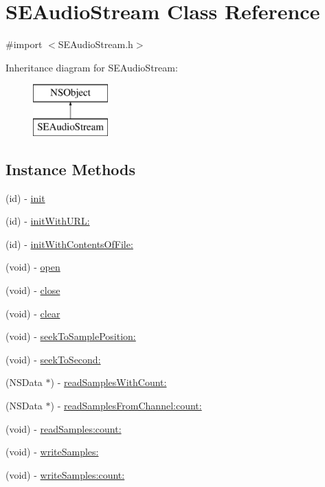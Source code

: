 \hypertarget{interface_s_e_audio_stream}{\section{S\-E\-Audio\-Stream Class Reference}
\label{interface_s_e_audio_stream}
}


{\ttfamily \#import $<$S\-E\-Audio\-Stream.\-h$>$}

Inheritance diagram for S\-E\-Audio\-Stream\-:\begin{figure}[H]
\begin{center}
\leavevmode
\includegraphics[height=2.000000cm]{interface_s_e_audio_stream}
\end{center}
\end{figure}
\subsection*{Instance Methods}
\begin{DoxyCompactItemize}
\item 
(id) -\/ \hyperlink{interface_s_e_audio_stream_adfb80527c355e64279d60a7b1af838ea}{init}
\item 
(id) -\/ \hyperlink{interface_s_e_audio_stream_a7acd0370d5f5066a6d00834af0eea200}{init\-With\-U\-R\-L\-:}
\item 
(id) -\/ \hyperlink{interface_s_e_audio_stream_a88b28dfe93892a08d261bd946beea26f}{init\-With\-Contents\-Of\-File\-:}
\item 
(void) -\/ \hyperlink{interface_s_e_audio_stream_add81dd9d9bd838f3a5dc1ceae94ccf26}{open}
\item 
(void) -\/ \hyperlink{interface_s_e_audio_stream_a8c4af367964e8be4817df12989f06d40}{close}
\item 
(void) -\/ \hyperlink{interface_s_e_audio_stream_ae59699f3f9cdf5fa000d9835da89e73e}{clear}
\item 
(void) -\/ \hyperlink{interface_s_e_audio_stream_a1dd26e76fbcd65f2d221f61de75fd3eb}{seek\-To\-Sample\-Position\-:}
\item 
(void) -\/ \hyperlink{interface_s_e_audio_stream_a720083efde7839f0a44ec7456805ffeb}{seek\-To\-Second\-:}
\item 
(N\-S\-Data $\ast$) -\/ \hyperlink{interface_s_e_audio_stream_a8d848d7a388d38fb670eb92e3bf6566d}{read\-Samples\-With\-Count\-:}
\item 
(N\-S\-Data $\ast$) -\/ \hyperlink{interface_s_e_audio_stream_a4501c22126f23cc1cb9ecbd1d7ddda6e}{read\-Samples\-From\-Channel\-:count\-:}
\item 
(void) -\/ \hyperlink{interface_s_e_audio_stream_ac80704c916ddbac8f8309f3a6a019e80}{read\-Samples\-:count\-:}
\item 
(void) -\/ \hyperlink{interface_s_e_audio_stream_ab184f74429643065a116a8f272bf79b3}{write\-Samples\-:}
\item 
(void) -\/ \hyperlink{interface_s_e_audio_stream_af19a129d2a78172d771f2552dd97f49b}{write\-Samples\-:count\-:}
\end{DoxyCompactItemize}
